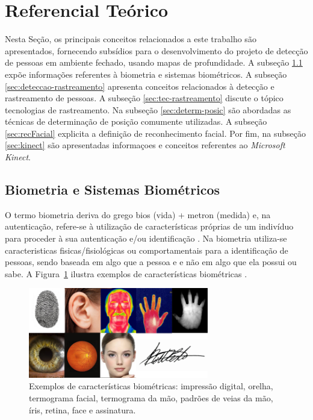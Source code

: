 \section{Referencial Teórico}\label{sec:referencial-teorico}

Nesta Seção, os principais conceitos relacionados a este trabalho são apresentados, fornecendo subsídios para o desenvolvimento do projeto de detecção de pessoas em ambiente fechado, usando mapas de profundidade. A subseção \ref{sec:biometria} expõe informações referentes à biometria e sistemas biométricos. A subseção \ref{sec:deteccao-rastreamento} apresenta conceitos relacionados à detecção e rastreamento de pessoas. A subseção \ref{sec:tec-rastreamento} discute o tópico tecnologias de rastreamento. Na subseção \ref{sec:determ-posic} são abordadas as técnicas de determinação de posição comumente utilizadas. A subseção \ref{sec:recFacial} explicita a definição de reconhecimento facial. Por fim, na subseção \ref{sec:kinect} são apresentadas informaçoes e conceitos referentes ao \textit{Microsoft Kinect}.

\subsection{Biometria e Sistemas Biométricos}\label{sec:biometria}
O termo biometria deriva do grego bios (vida) + metron (medida) e, na autenticação, refere-se à utilização de características próprias de um indivíduo para proceder à sua autenticação e/ou identificação \cite{magalhaes2003biometria}. Na biometria utiliza-se caracteristicas fisicas/fisiológicas ou comportamentais para a identificação de pessoas, sendo baseada em algo que a pessoa e e não em algo que ela possui ou sabe. A Figura~\ref{fig:biometria} ilustra exemplos de características biométricas \cite{cardia2015avaliaccao}.

\begin{figure}[ht]
\centering
    \includegraphics[resolution=300,width=0.7\textwidth,natwidth=610,natheight=642]{images/biometria.png}
    \caption{Exemplos de características biométricas: impressão digital, orelha, termograma facial, termograma da mão, padrões de veias da mão, íris, retina, face e assinatura.}
    \label{fig:biometria}
\end{figure}

